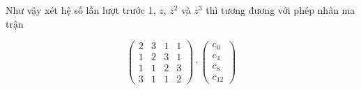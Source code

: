 \documentclass{article}
\begin{document}
Như vậy xét hệ số lần lượt trước 1, $z$, $z^2$ và $z^3$ thì tương đương với phép
nhân ma trận

\begin{equation}
    \begin{pmatrix}
        2 & 3 & 1 & 1 \\
        1 & 2 & 3 & 1 \\
        1 & 1 & 2 & 3 \\
        3 & 1 & 1 & 2
    \end{pmatrix} \cdot
    \begin{pmatrix}
        c_0 \\ c_4 \\ c_8 \\ c_{12}
    \end{pmatrix}
\end{equation}
\end{document}

